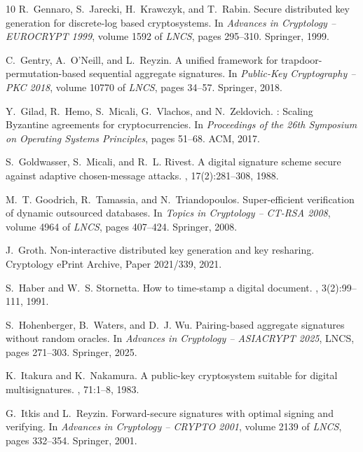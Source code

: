 \documentclass[11pt]{article}
\theoremstyle{definition}
\begin{document}
\begin{thebibliography}{10}
R.~Gennaro, S.~Jarecki, H.~Krawczyk, and T.~Rabin.
\newblock Secure distributed key generation for discrete-log based
  cryptosystems.
\newblock In {\em Advances in Cryptology -- EUROCRYPT 1999}, volume 1592 of
  {\em LNCS}, pages 295--310. Springer, 1999.

C.~Gentry, A.~O'Neill, and L.~Reyzin.
\newblock A unified framework for trapdoor-permutation-based sequential
  aggregate signatures.
\newblock In {\em Public-Key Cryptography -- PKC 2018}, volume 10770 of {\em
  LNCS}, pages 34--57. Springer, 2018.

Y.~Gilad, R.~Hemo, S.~Micali, G.~Vlachos, and N.~Zeldovich.
: Scaling {Byzantine} agreements for cryptocurrencies.
\newblock In {\em Proceedings of the 26th Symposium on Operating Systems
  Principles}, pages 51--68. ACM, 2017.

S.~Goldwasser, S.~Micali, and R.~L. Rivest.
\newblock A digital signature scheme secure against adaptive chosen-message
  attacks.
, 17(2):281--308, 1988.

M.~T. Goodrich, R.~Tamassia, and N.~Triandopoulos.
\newblock Super-efficient verification of dynamic outsourced databases.
\newblock In {\em Topics in Cryptology -- CT-RSA 2008}, volume 4964 of {\em
  LNCS}, pages 407--424. Springer, 2008.

J.~Groth.
\newblock Non-interactive distributed key generation and key resharing.
\newblock Cryptology ePrint Archive, Paper 2021/339, 2021.

S.~Haber and W.~S. Stornetta.
\newblock How to time-stamp a digital document.
, 3(2):99--111, 1991.

S.~Hohenberger, B.~Waters, and D.~J. Wu.
\newblock Pairing-based aggregate signatures without random oracles.
\newblock In {\em Advances in Cryptology -- ASIACRYPT 2025}, LNCS, pages
  271--303. Springer, 2025.

K.~Itakura and K.~Nakamura.
\newblock A public-key cryptosystem suitable for digital multisignatures.
, 71:1--8, 1983.

G.~Itkis and L.~Reyzin.
\newblock Forward-secure signatures with optimal signing and verifying.
\newblock In {\em Advances in Cryptology -- CRYPTO 2001}, volume 2139 of {\em
  LNCS}, pages 332--354. Springer, 2001.


\end{thebibliography}
\end{document}
